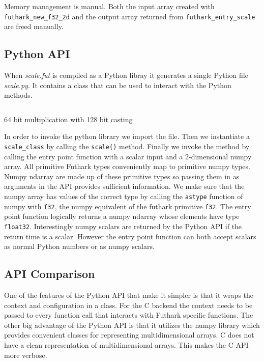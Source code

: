 \documentclass[11pt]{book}
\begin{document}
Memory management is manual. Both the input array created with \texttt{futhark\_new\_f32\_2d} and the output array returned from \texttt{futhark\_entry\_scale} are freed manually.

\subsection{Python API}

When \textit{scale.fut} is compiled as a Python libray it generates a single Python file \textit{scale.py}. It contains a class that can be used to interact with the Python methods.
\begin{listing}[H] 
        \inputminted[fontsize=\small,baselinestretch=0.5,linenos]{Python}{code/compiler/api_examples/example.py}
        \caption{64 bit multiplication with 128 bit casting}
        \label{lst:int128}    
\end{listing} 


In order to invoke the python library we import the file. Then we instantiate a \texttt{scale\_class} by calling the \texttt{scale()} method. Finally we invoke the method by calling the entry point function with a scalar input and a 2-dimensional numpy array. All primitive Futhark types conveniently map to primitive numpy types. Numpy ndarray are made up of these primitive types so passing them in as arguments in the API provides sufficient information. We make sure that the numpy array has values of the correct type by calling the \texttt{astype} function of numpy with \texttt{f32}, the numpy equivalent of the futhark primitive \texttt{f32}. The entry point function logically returns a numpy ndarray whose elements have type \texttt{float32}. Interestingly numpy scalars are returned by the Python API if the return time is a scalar. However the entry point function can both accept scalars as normal Python numbers or as numpy scalars.


\subsection{API Comparison}

One of the features of the Python API that make it simpler is that it wraps the context and configuration in a class. For the C backend the context needs to be passed to every function call that interacts with Futhark specific functions. The other big advantage of the Python API is that it utilizes the numpy library which provides convenient classes for representing multidimensional arrays. C does not have a clean representation of multidimensional arrays. This makes the C API more verbose.
\end{document}
